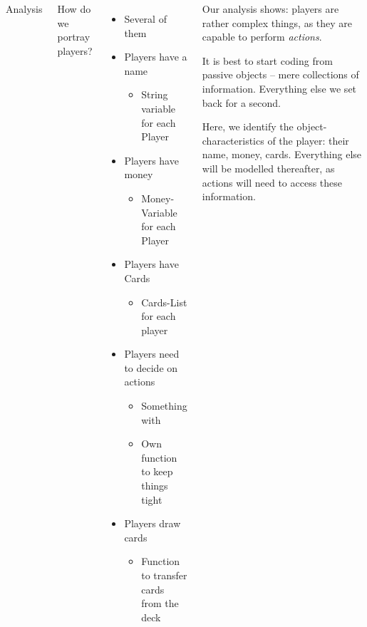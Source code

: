 \begin{frame}[fragile]
%
%
\begin{columns}[T]
\begin{Large}
	{Analysis}
\end{Large}

How do we portray players?
\begin{itemize}
\item Several of them \Thus {}
\item Players have a name
	\begin{itemize}
	\item[\Thus] String variable for each Player
	\end{itemize}
\item Players have money
	\begin{itemize}
	\item[\Thus] Money-Variable for each Player
	\end{itemize}
\item Players have Cards
	\begin{itemize}
	\item[\Thus] Cards-List for each player
	\end{itemize}
\item Players need to decide on actions
	\begin{itemize}
	\item[\Thus] Something with 
	\item[\Thus] Own function to keep things tight
	\end{itemize}
\item Players draw cards
	\begin{itemize}
	\item[\Thus] Function to transfer cards from the deck
	\end{itemize}
\end{itemize}
%
\begin{hintbox}
Our analysis shows: players are rather complex things, as they are capable to perform \emph{actions}.

It is best to start coding from passive objects -- mere collections of information. Everything else we set back for a second.

Here, we identify the object-characteristics of the player: their name, money, cards. Everything else will be modelled thereafter, as actions will need to access these information.
\end{hintbox}
\end{columns}
%
\end{frame}
	
